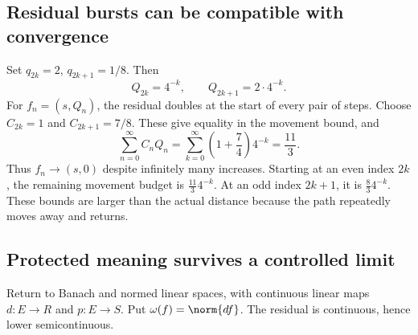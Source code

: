 
\subsection{Residual bursts can be compatible with convergence}
Set \(q_{2k}=2\), \(q_{2k+1}=1/8\). Then
\[
 Q_{2k}=4^{-k},\qquad Q_{2k+1}=2\cdot4^{-k}.
\]
For \(f_n=(s,Q_n)\), the residual doubles at the start of every pair of steps. Choose \(C_{2k}=1\) and \(C_{2k+1}=7/8\). These give equality in the movement bound, and
\[
 \sum_{n=0}^{\infty}C_nQ_n
 =\sum_{k=0}^{\infty}\left(1+\frac74\right)4^{-k}
 =\frac{11}{3}.
\]
Thus \(f_n\to(s,0)\) despite infinitely many increases. Starting at an even index \(2k\), the remaining movement budget is \(\frac{11}{3}4^{-k}\). At an odd index \(2k+1\), it is \(\frac83 4^{-k}\). These bounds are larger than the actual distance because the path repeatedly moves away and returns.


\subsection{Protected meaning survives a controlled limit}
Return to Banach and normed linear spaces, with continuous linear maps \(d:E\to R\) and \(p:E\to S\). Put \(\omega(f)=\norm{df}\). The residual is continuous, hence lower semicontinuous.

